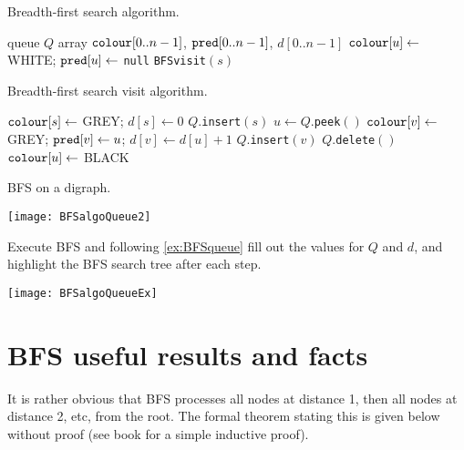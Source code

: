 \begin{algorithm}[H]
  \caption{Breadth-first search algorithm.}
    \label{alg:BFScode}
\begin{algorithmic}[1]
	\State queue $Q$  
	\State array $\operatorname{\text{\texttt{colour}}}[0..n-1]$, $\operatorname{\text{\texttt{pred}}}[0..n-1]$, $d[0..n-1]$
		\State $\operatorname{\text{\texttt{colour}}}[u] \gets $ WHITE; $\operatorname{\text{\texttt{pred}}}[u] \gets $ \texttt{null}
	\EndFor
			\State \texttt{BFSvisit}$(s)$
		\EndIf
	\EndFor
	\State {}
\EndFunction
\end{algorithmic}
\end{algorithm}

\begin{algorithm}[H]
  \caption{Breadth-first search visit algorithm.}
     \label{alg:BFSvisitcode}
  \begin{algorithmic}[1]
	\State $\operatorname{\text{\texttt{colour}}}[s] \gets $ GREY; $d[s] \gets 0$ 
	\State $Q$.\texttt{insert}$(s)$
		\State $u \gets Q$.\texttt{peek}$()$
				\State $\operatorname{\text{\texttt{colour}}}[v] \gets $ GREY; $\operatorname{\text{\texttt{pred}}}[v] \gets u$; $d[v] \gets d[u]+1$
				\State $Q$.\texttt{insert}$(v)$
			\EndIf
		\EndFor
		\State $Q$.\texttt{delete}$()$
		\State $\operatorname{\text{\texttt{colour}}}[u] \gets $ BLACK
	\EndWhile
\EndFunction
\end{algorithmic}
\end{algorithm}

\begin{Boxample} \label{ex:BFSqueue}
BFS on a digraph.
\begin{center}
  \texttt{[image: BFSalgoQueue2]}
\end{center}
\end{Boxample}

\begin{Boxample}
Execute BFS and following \cref{ex:BFSqueue} fill out the values for $Q$ and $d$, and highlight the BFS search tree after each step. 
\begin{center}
  \texttt{[image: BFSalgoQueueEx]}
\end{center}
\end{Boxample}

\section{BFS useful results and facts} 
It is rather obvious that BFS processes all nodes at distance 1, then
all nodes at distance 2, etc, from the root. 
The formal theorem stating this is given below without proof (see book for a simple inductive proof).


